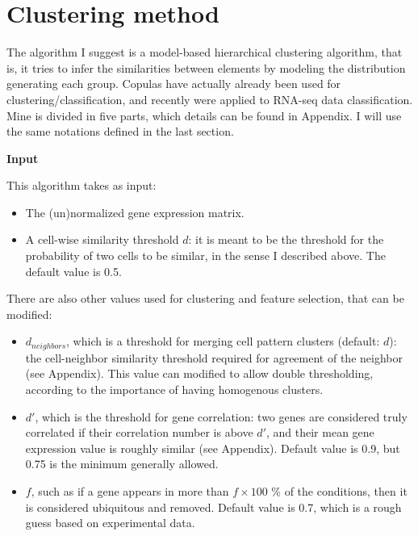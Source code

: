 \documentclass{report}
\begin{document}
{\newpage

\section{Clustering method}

The algorithm I suggest is a model-based hierarchical clustering algorithm\cite{fraley2002model}, that is, it tries to infer the similarities between elements by modeling the distribution generating each group. Copulas have actually already been used for clustering/classification\cite{stitou2009copulas}\cite{kosmidis2014model}, and recently were applied to RNA-seq data classification\cite{zhang2017classification}.\\

Mine is divided in five parts, which details can be found in Appendix. I will use the same notations defined in the last section.

\bigskip
\noindent \textbf{Input}
\bigskip

This algorithm takes as input:\\

\begin{itemize}
\item The (un)normalized gene expression matrix.
\item A cell-wise similarity threshold $d$: it is meant to be the threshold for the probability of two cells to be similar, in the sense I described above. The default value is 0.5.
\end{itemize}

There are also other values used for clustering and feature selection, that can be modified:

\begin{itemize}
\item $d_{neighbors}$, which is a threshold for merging cell pattern clusters (default: $d$): the cell-neighbor similarity threshold required for agreement of the neighbor (see Appendix). This value can modified to allow double thresholding, according to the importance of having homogenous clusters.
\item $d'$, which is the threshold for gene correlation: two genes are considered truly correlated if their correlation number is above $d'$, and their mean gene expression value is roughly similar (see Appendix). Default value is 0.9, but 0.75 is the minimum generally allowed\cite{featureselectioncaret}.
\item $f$, such as if a gene appears in more than $f \times 100$ \% of the conditions, then it is considered ubiquitous and removed. Default value is 0.7, which is a rough guess based on experimental data.
\end{itemize}

}
\end{document}
